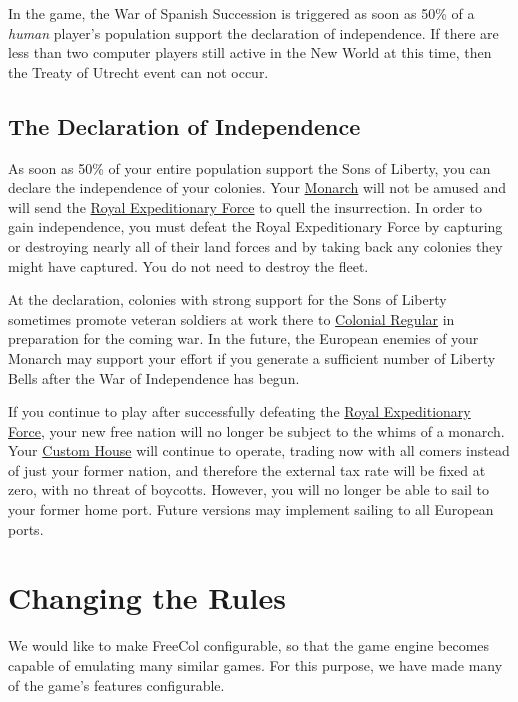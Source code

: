 \documentclass[12pt]{book}
\begin{document}
In the game, the War of Spanish Succession is triggered as soon as
50\% of a {\em human} player's population support the declaration of
independence. If there are less than two computer players still active
in the New World at this time, then the Treaty of Utrecht event can
not occur.


\hypertarget{Declaration of Independence}{\section{The Declaration
of Independence}}

As soon as 50\% of your entire population support the Sons of Liberty,
you can declare the independence of your colonies.  Your
\hyperlink{Monarch}{Monarch} will not be amused and will send the
\hyperlink{Royal Expeditionary Force}{Royal Expeditionary Force} to
quell the insurrection. In order to gain independence, you must defeat
the Royal Expeditionary Force by capturing or destroying nearly all of
their land forces and by taking back any colonies they might have
captured. You do not need to destroy the fleet.

At the declaration, colonies with strong support for the Sons of
Liberty sometimes promote veteran soldiers at work there to
\hyperlink{Colonial Regular}{Colonial Regular} in preparation for the
coming war.  In the future, the European enemies of your Monarch may
support your effort if you generate a sufficient number of Liberty
Bells after the War of Independence has begun.

If you continue to play after successfully defeating the
\hyperlink{Royal Expeditionary Force}{Royal Expeditionary Force}, your
new free nation will no longer be subject to the whims of a monarch.
Your \hyperlink{Custom House}{Custom House} will continue to operate,
trading now with all comers instead of just your former nation, and
therefore the external tax rate will be fixed at zero, with no threat of
boycotts.  However, you will no longer be able to sail to your former
home port.  Future versions may implement sailing to all European ports.

\hypertarget{Changing the Rules}{\chapter{Changing the Rules}}

We would like to make FreeCol configurable, so that the game engine
becomes capable of emulating many similar games. For this purpose,
we have made many of the game's features configurable.
\end{document}

